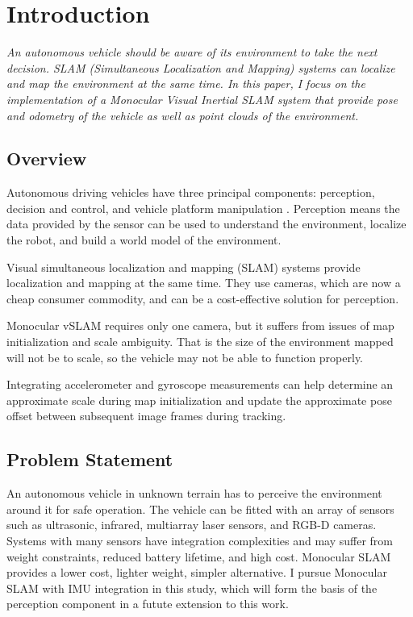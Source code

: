 \setlength{\footskip}{8mm}

\chapter{Introduction}

\textit{An autonomous vehicle should be aware of its environment to take the next decision. SLAM (Simultaneous Localization and Mapping) systems can localize and map the environment at the same time. In this paper, I focus on the implementation of a Monocular Visual Inertial SLAM system that provide pose and odometry of the vehicle as well as point clouds of the environment.}

\section{Overview}

Autonomous driving vehicles have three principal components: perception, decision and control, and vehicle platform manipulation . Perception means the data provided by the sensor can be used to understand the environment, localize the robot, and build a world model of the environment.

Visual simultaneous localization and mapping (SLAM) systems provide localization and mapping at the same time. They use cameras, which are now a cheap consumer commodity, and can be a cost-effective solution for perception.

Monocular vSLAM requires only one camera, but it suffers from issues of map initialization and scale ambiguity. That is the size of the environment mapped will not be to scale, so the vehicle may not be able to function properly.

Integrating accelerometer and gyroscope measurements can help determine an approximate scale during map initialization and update the approximate pose offset between subsequent image frames during tracking.


\section{Problem Statement}

An autonomous vehicle in unknown terrain has to perceive the environment around it for safe operation. The vehicle can be fitted with an array of sensors such as ultrasonic, infrared, multiarray laser sensors, and RGB-D cameras. Systems with many sensors have integration complexities and may suffer from weight constraints, reduced battery lifetime, and high cost. Monocular SLAM provides a lower cost, lighter weight, simpler alternative. I pursue Monocular SLAM with IMU integration in this study, which will form the basis of the perception component in a futute extension to this work.


